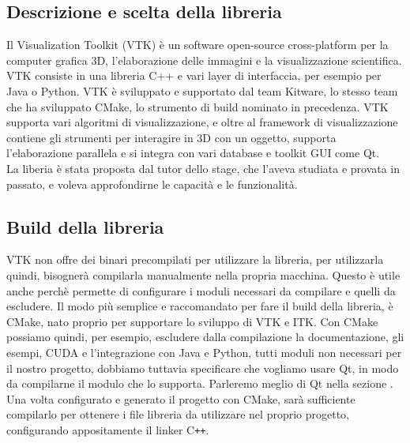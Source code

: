 \subsection{Descrizione e scelta della libreria}\label{sec:scelta-liberia}
Il Visualization Toolkit (VTK) è un software open-source cross-platform per la computer grafica 3D, l'elaborazione delle immagini e la visualizzazione scientifica. VTK consiste in una libreria C++ e vari layer di interfaccia, per esempio per Java o Python. VTK è sviluppato e supportato dal team Kitware, lo stesso team che ha sviluppato CMake, lo strumento di build nominato in precedenza. VTK supporta vari algoritmi di visualizzazione, e oltre al framework di visualizzazione contiene gli strumenti per interagire in 3D con un oggetto, supporta l'elaborazione parallela e si integra con vari database e toolkit GUI come Qt.\\
La liberia è stata proposta dal tutor dello stage, che l'aveva studiata e provata in passato, e voleva approfondirne le capacità e le funzionalità.

\subsection{Build della libreria}\label{sec:build-liberia}
VTK non offre dei binari precompilati per utilizzare la libreria, per utilizzarla quindi, bisognerà compilarla manualmente nella propria macchina. Questo è utile anche perchè permette di configurare i moduli necessari da compilare e quelli da escludere. Il modo più semplice e raccomandato per fare il build della libreria, è CMake, nato proprio per supportare lo sviluppo di VTK e ITK. Con CMake possiamo quindi, per esempio, escludere dalla compilazione la documentazione, gli esempi, CUDA e l'integrazione con Java e Python, tutti moduli non necessari per il nostro progetto, dobbiamo tuttavia specificare che vogliamo usare Qt, in modo da compilarne il modulo che lo supporta. Parleremo meglio di Qt nella sezione .\\
Una volta configurato e generato il progetto con CMake, sarà sufficiente compilarlo per ottenere i file libreria da utilizzare nel proprio progetto, configurando appositamente il linker C\texttt{++}.


